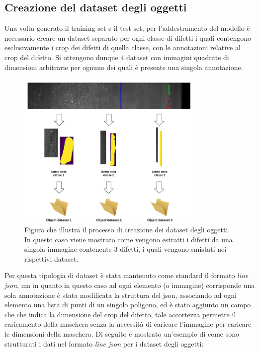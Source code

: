 \subsection{Creazione del dataset degli oggetti}
Una volta generato il training set e il test set, per l'addestramento del modello è necessario creare un dataset separato per ogni
classe di difetti i quali contengono esclusivamente i crop dei difetti di quella classe, con le annotazioni relative al crop del difetto.
Si ottengono dunque 4 dataset con immagini quadrate di dimensioni arbitrarie per ognuno dei quali è presente una singola annotazione.

\begin{figure}[H]
    \centering
    \includegraphics[width=0.8\textwidth]{imgs/Coigan/Object_dataset_generation.drawio.png}
    \caption{Figura che illustra il processo di creazione dei dataset degli oggetti. In questo caso viene mostrato come
    vengono estratti i difetti da una singola immagine contenente 3 difetti, i quali vengono smistati nei rispettivi dataset.}
    \label{fig:object_dataset_generation}
\end{figure}

Per questa tipologia di dataset è stata mantenuto come standard il formato \textit{line json}, ma in quanto in questo caso ad ogni elemento (o immagine) 
corrisponde una sola annotazione è stata modificata la struttura del json, associando ad ogni elemento una lista di punti di un singolo poligono,
ed è stato aggiunto un campo che che indica la dimensione del crop del difetto, tale accortezza permette il caricamento della maschera
senza la necessità di caricare l'immagine per caricare le dimensioni della maschera. Di seguito è mostrato un'esempio di come sono strutturati 
i dati nel formato \textit{line json} per i dataset degli oggetti:


